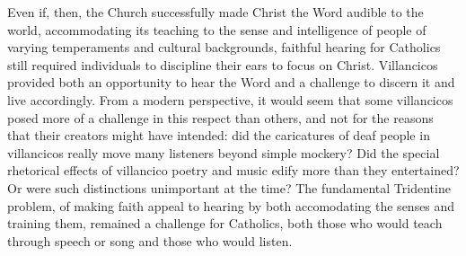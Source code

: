 Even if, then, the Church successfully made Christ the Word audible to the world,
accommodating its teaching to the sense and intelligence of people of varying
temperaments and cultural backgrounds, faithful hearing for Catholics still required
individuals to discipline their ears to focus on Christ.
Villancicos provided both an opportunity to hear the Word and a challenge to
discern it and live accordingly.
From a modern perspective, it would seem that some villancicos posed more of a
challenge in this respect than others, and not for the reasons that their
creators might have intended: did the caricatures of deaf people in villancicos
really move many listeners beyond simple mockery?
Did the special rhetorical effects of villancico poetry and music edify more
than they entertained?
Or were such distinctions unimportant at the time?
The fundamental Tridentine problem, of making faith appeal to hearing by both 
accomodating the senses and training them, remained a challenge for Catholics, 
both those who would teach through speech or song and those who would listen.



